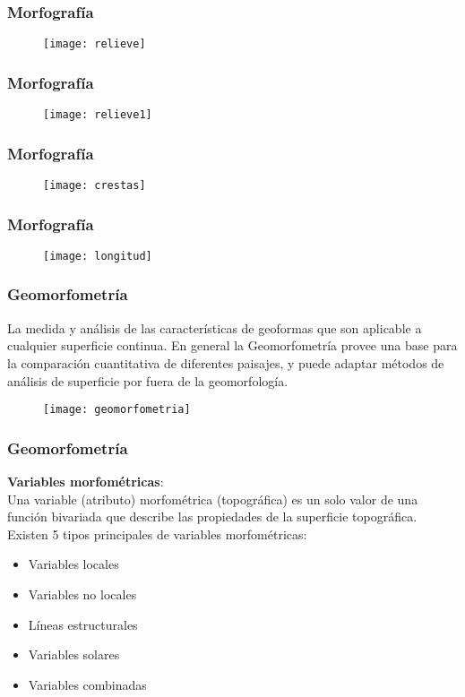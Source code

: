 \documentclass{beamer}
\begin{document}
\begin{frame}
\frametitle{Morfografía} 
 \begin{figure}
    \centering
    \texttt{[image: relieve]}
  \end{figure}
\end{frame}
\begin{frame}
\frametitle{Morfografía} 
 \begin{figure}
    \centering
    \texttt{[image: relieve1]}
  \end{figure}
\end{frame}
\begin{frame}
\frametitle{Morfografía} 
 \begin{figure}
    \centering
    \texttt{[image: crestas]}
  \end{figure}
\end{frame}
\begin{frame}
\frametitle{Morfografía} 
 \begin{figure}
    \centering
    \texttt{[image: longitud]}
  \end{figure}
\end{frame}
\begin{frame}
\frametitle{Geomorfometría}
\scriptsize{La medida y análisis de las características de geoformas que son aplicable a cualquier superficie continua. En general la Geomorfometría provee una base para la comparación cuantitativa de diferentes paisajes, y puede adaptar métodos de análisis de superficie por fuera de la geomorfología.} 
 \begin{figure}
    \centering
    \texttt{[image: geomorfometria]}
  \end{figure}
\end{frame}
\begin{frame}
\frametitle{Geomorfometría}
\small{\textbf{Variables morfométricas}:\\
Una variable (atributo) morfométrica (topográfica) es un solo valor de una función bivariada que describe las propiedades de la superficie topográfica.\\
\vspace{10pt}
Existen 5 tipos principales de variables morfométricas:
\begin{itemize}
\item Variables locales
\item Variables no locales
\item Líneas estructurales
\item Variables solares
\item Variables combinadas
\end{itemize}
} 
\end{frame}
\end{document}
